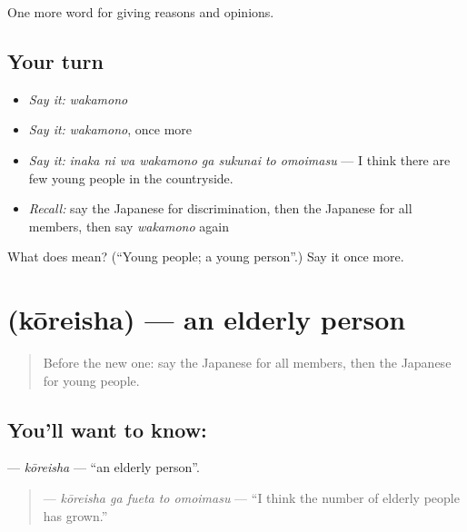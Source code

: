 \begin{grammarlens}[title={What you've built}]
One more word for giving reasons and opinions.
\end{grammarlens}

\subsection*{Your turn}
\begin{itemize}
\raggedright
  \item \emph{Say it:} \emph{wakamono}
  \item \emph{Say it:} \emph{wakamono}, once more
  \item \emph{Say it:} \emph{inaka ni wa wakamono ga sukunai to omoimasu} — I think there are few young people in the countryside.
  \item \emph{Recall:} say the Japanese for discrimination, then the Japanese for all members, then say \emph{wakamono} again
\end{itemize}

\begin{tcolorbox}[breakable,colback=teal!4,colframe=teal!35!black,title={Before you move on}]
What does  mean? (\textquotedblleft{}Young people; a young person\textquotedblright{}.) Say it once more.
\end{tcolorbox}
\section[\texorpdfstring{\ja{こうれいしゃ} (kōreisha)}{こうれいしゃ (kōreisha)}]{ (kōreisha) — an elderly person}

\label{lesson:JA-C333-koureisha}



\begin{quote}
Before the new one: say the Japanese for all members, then the Japanese for young people.
\end{quote}

\subsection*{You'll want to know: }
\textbf{} — \emph{kōreisha} — \textquotedblleft{}an elderly person\textquotedblright{}.

\begin{quote}
\textbf{  } — \emph{kōreisha ga fueta to omoimasu} — \textquotedblleft{}I think the number of elderly people has grown.\textquotedblright{}
\end{quote}

